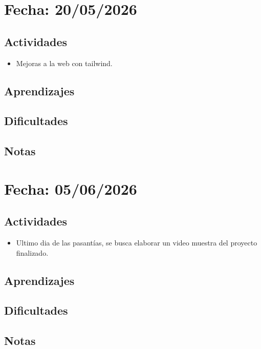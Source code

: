 \documentclass[12pt, a4paper]{article}
\begin{document}
    \section*{Fecha: 20/05/2026}

    \subsection*{Actividades}

    \begin{itemize}
        \item Mejoras a la web con tailwind.
    \end{itemize}

    \subsection*{Aprendizajes}

    \subsection*{Dificultades}

    \subsection*{Notas}
    
    \section*{Fecha: 05/06/2026}

    \subsection*{Actividades}

    \begin{itemize}
        \item Ultimo dia de las pasantías, se busca elaborar un video muestra del proyecto finalizado.
    \end{itemize}

    \subsection*{Aprendizajes}

    \subsection*{Dificultades}

    \subsection*{Notas}
\end{document}
